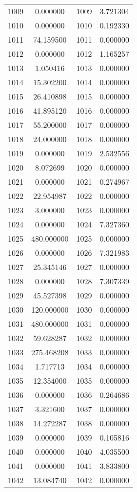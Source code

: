 \documentclass[12pt]{article}
\begin{document}
\begin{longtable}{@{}cccc@{}}
1009 & 0.000000 & 1009 & 3.721304 \\
1010 & 0.000000 & 1010 & 0.192330 \\
1011 & 74.159500 & 1011 & 0.000000 \\
1012 & 0.000000 & 1012 & 1.165257 \\
1013 & 1.050416 & 1013 & 0.000000 \\
1014 & 15.302200 & 1014 & 0.000000 \\
1015 & 26.410898 & 1015 & 0.000000 \\
1016 & 41.895120 & 1016 & 0.000000 \\
1017 & 55.200000 & 1017 & 0.000000 \\
1018 & 24.000000 & 1018 & 0.000000 \\
1019 & 0.000000 & 1019 & 2.532556 \\
1020 & 8.072699 & 1020 & 0.000000 \\
1021 & 0.000000 & 1021 & 0.274967 \\
1022 & 22.954987 & 1022 & 0.000000 \\
1023 & 3.000000 & 1023 & 0.000000 \\
1024 & 0.000000 & 1024 & 7.327360 \\
1025 & 480.000000 & 1025 & 0.000000 \\
1026 & 0.000000 & 1026 & 7.321983 \\
1027 & 25.345146 & 1027 & 0.000000 \\
1028 & 0.000000 & 1028 & 7.307339 \\
1029 & 45.527398 & 1029 & 0.000000 \\
1030 & 120.000000 & 1030 & 0.000000 \\
1031 & 480.000000 & 1031 & 0.000000 \\
1032 & 59.628287 & 1032 & 0.000000 \\
1033 & 275.468208 & 1033 & 0.000000 \\
1034 & 1.717713 & 1034 & 0.000000 \\
1035 & 12.354000 & 1035 & 0.000000 \\
1036 & 0.000000 & 1036 & 0.264686 \\
1037 & 3.321600 & 1037 & 0.000000 \\
1038 & 14.272287 & 1038 & 0.000000 \\
1039 & 0.000000 & 1039 & 0.105816 \\
1040 & 0.000000 & 1040 & 4.035500 \\
1041 & 0.000000 & 1041 & 3.833800 \\
1042 & 13.084740 & 1042 & 0.000000 \\

\end{longtable}
\end{document}
